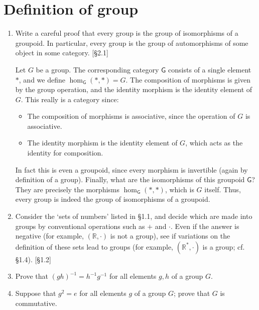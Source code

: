 \section{Definition of group}
\begin{enumerate}
    \item Write a careful proof that every group is the group of isomorphisms of a groupoid. In particular, every group is the group of automorphisms of some object in some category. [\S2.1]

          \begin{solution}
              Let $G$ be a group. The corresponding category $\mathsf{G}$ consists of a single element $*$, and we define $\hom_\mathsf{G}(*,*) = G$. The composition of morphisms is given by the group operation, and the identity morphism is the identity element of $G$. This really is a category since:
              \begin{itemize}
                  \item The composition of morphisms is associative, since the operation of $G$ is associative.
                  \item The identity morphism is the identity element of $G$, which acts as the identity for composition.
              \end{itemize}
              In fact this is even a groupoid, since every morphism is invertible (again by definition of a group). Finally, what are the isomorphisms of this groupoid $\mathsf{G}$? They are precisely the morphisms $\hom_\mathsf{G}(*,*)$, which is $G$ itself. Thus, every group is indeed the group of isomorphisms of a groupoid.
          \end{solution}

    \item Consider the `sets of numbers' listed in \S1.1, and decide which are made into groups by conventional operations such as $+$ and $\cdot$. Even if the answer is negative (for example, $(\mathbb{R}, \cdot)$ is not a group), see if variations on the definition of these sets lead to groups (for example, $(\mathbb{R}^*,\cdot)$ is a group; cf. \S1.4). [\S1.2]

    \item Prove that $(gh)^{-1} = h^{-1}g^{-1}$ for all elements $g, h$ of a group $G$.

    \item Suppose that $g^2 = e$ for all elements $g$ of a group $G$; prove that $G$ is commutative.


\end{enumerate}
